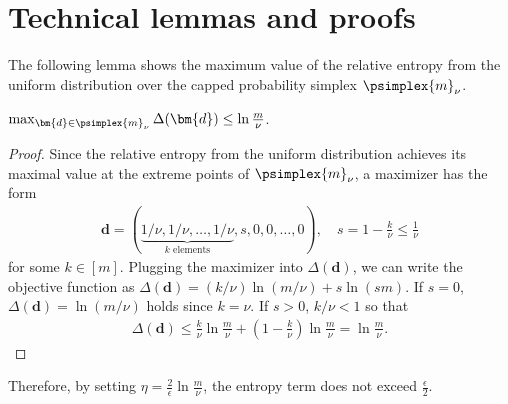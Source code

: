 \section{Technical lemmas and proofs}
\label{appendix:technical_lem.}
The following lemma shows the maximum value of the relative entropy 
from the uniform distribution 
over the capped probability simplex $\psimplex{m}_{\nu}$.
\begin{lem.}
    \label{lem:relative_entropy_bound}
    $
        \max_{\bm{d} \in \psimplex{m}_{\nu}}
        \Delta(\bm{d}) \leq \ln \frac{m}{\nu}
    $.
\end{lem.}
\begin{proof}
    Since the relative entropy from the uniform distribution 
    achieves its maximal value 
    at the extreme points of $\psimplex{m}_{\nu}$, 
    a maximizer has the form 
    \begin{align}
        \nonumber
        \bm{d} = (
            \underbrace{1/\nu, 1/\nu, \dots, 1/\nu}_{k \text{ elements}},
            s,
            0, 0, \dots, 0
        ),
        \quad s = 1 - \frac{k}{\nu} \leq \frac 1 \nu
    \end{align}
    for some $k \in [m]$. 
    Plugging the maximizer into $\Delta(\bm{d})$, 
    we can write the objective function as 
    $\Delta(\bm{d}) = (k/\nu) \ln (m/\nu) + s \ln (sm)$. 
    If $s = 0$, $\Delta(\bm{d}) = \ln (m/\nu)$ holds since $k = \nu$. 
    If $s > 0$, $k / \nu < 1$ so that 
    \begin{align*}
        \Delta(\bm{d}) \leq \frac k \nu \ln \frac m \nu
            + \left(1 - \frac k \nu\right) \ln \frac m \nu
            = \ln \frac m \nu.
    \end{align*}
\end{proof}
Therefore, by setting $\eta = \frac{2}{\epsilon} \ln \frac{m}{\nu}$, 
the entropy term does not exceed $\frac{\epsilon}{2}$. 

